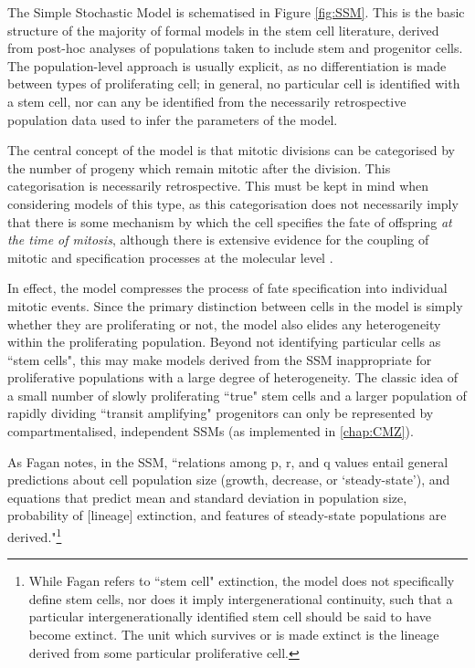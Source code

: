 \documentclass{ut-thesis}
\begin{document}
\begin{NoHyper}
The Simple Stochastic Model is schematised in Figure \ref{fig:SSM}. This is the basic structure of the majority of formal models in the stem cell literature, derived from post-hoc analyses of populations taken to include stem and progenitor cells. The population-level approach is usually explicit, as no differentiation is made between types of proliferating cell; in general, no particular cell is identified with a stem cell, nor can any be identified from the necessarily retrospective population data used to infer the parameters of the model. 

The central concept of the model is that mitotic divisions can be categorised by the number of progeny which remain mitotic after the division. This categorisation is necessarily retrospective. This must be kept in mind when considering models of this type, as this categorisation does not necessarily imply that there is some mechanism by which the cell specifies the fate of offspring \textit{at the time of mitosis}, although there is extensive evidence for the coupling of mitotic and specification processes at the molecular level \cite{Tran2013,Tee2014,Dalton2015,Deschamps2017}.

In effect, the model compresses the process of fate specification into individual mitotic events. Since the primary distinction between cells in the model is simply whether they are proliferating or not, the model also elides any heterogeneity within the proliferating population. Beyond not identifying particular cells as ``stem cells", this may make models derived from the SSM inappropriate for proliferative populations with a large degree of heterogeneity. The classic idea of a small number of slowly proliferating ``true" stem cells and a larger population of rapidly dividing ``transit amplifying" progenitors can only be represented by compartmentalised, independent SSMs (as implemented in \autoref{chap:CMZ}).

As Fagan notes, in the SSM, ``relations among p, r, and q values entail general predictions about cell population size (growth, decrease, or ‘steady-state’), and equations that predict mean and standard deviation in population size, probability of [lineage] extinction, and features of steady-state populations are derived."\footnote{While Fagan refers to ``stem cell" extinction, the model does not specifically define stem cells, nor does it imply intergenerational continuity, such that a particular intergenerationally identified stem cell should be said to have become extinct. The unit which survives or is made extinct is the lineage derived from some particular proliferative cell.} \cite[p.60]{Fagan2013}


\end{NoHyper}
\end{document}
